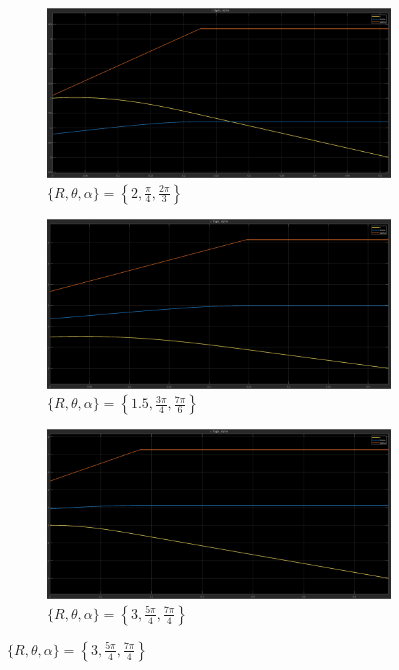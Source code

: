 \documentclass[12pt]{article}
\begin{document}
\begin{figure}[h]
    \centering
    \begin{subfigure}{.48\textwidth}
        \centering
        \includegraphics[width=0.9\linewidth]{images/Q1.png}
		\caption{\(\{R, \theta, \alpha\} = \left\{2, \frac{\pi}{4}, \frac{2\pi}{3}\right\}\)}
    \end{subfigure}
    \begin{subfigure}{.48\textwidth}
        \centering
        \includegraphics[width=0.9\linewidth]{images/Q2.png}
		\caption{\(\{R, \theta, \alpha\} = \left\{1.5, \frac{3\pi}{4}, \frac{7\pi}{6}\right\}\)}
    \end{subfigure}
	\begin{subfigure}{.48\textwidth}
        \centering
        \includegraphics[width=0.9\linewidth]{images/Q3.png}
		\caption{\(\{R, \theta, \alpha\} = \left\{3, \frac{5\pi}{4}, \frac{7\pi}{4}\right\}\)}

\end{subfigure}
\end{figure}
\end{document}
